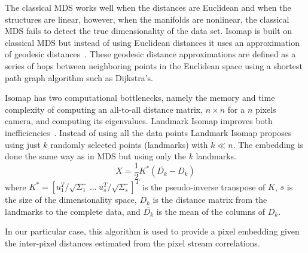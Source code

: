 The classical MDS works well when the distances are Euclidean and when the structures are linear, however, when the manifolds are nonlinear, the classical MDS fails to detect the true dimensionality of the data set. 
%
Isomap is built on classical MDS but instead of using Euclidean distances it uses an approximation of geodesic distances~\cite{Isomap}. These geodesic distance approximations are defined as a series of hops between neighboring points in the Euclidean space using a shortest path graph algorithm such as Dijkstra's.

Isomap has two computational bottlenecks, namely the memory and time complexity of computing an all-to-all distance matrix, $n\times n$ for a $n$ pixels camera, and computing its eigenvalues.
Landmark Isomap improves both inefficiencies~\cite{Landmark}.  Instead of using all the data points Landmark Isomap proposes using just $k$ randomly selected points (landmarks) with $k \ll n$. The embedding is done the same way as in MDS but using only the $k$ landmarks. 
%
\begin{equation}
X=\frac{1}{2}K^*(\overline{D_k}-D_k)
\label{eq:iso_other_pts}
\end{equation}   
%
where $K^*=[u_1^T/\sqrt{\Sigma_1}\ \hdots \ u_s^T/\sqrt{\Sigma_s}]^T$ is the pseudo-inverse transpose of $K$, $s$ is the size of the dimensionality space, $D_k$ is the distance matrix from the landmarks to the complete data, and $\overline{D_k}$ is the mean of the columns of $D_k$.  

In our particular case, this algorithm is used to provide a pixel embedding given the inter-pixel distances estimated from the pixel stream correlations.

